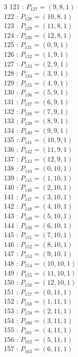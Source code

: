 \documentclass{article}
\begin{document}
{\begin{multicols}{3}
121 : $P_{127}=( 9, 8, 1 )$\\
122 : $P_{128}=( 10, 8, 1 )$\\
123 : $P_{129}=( 11, 8, 1 )$\\
124 : $P_{130}=( 12, 8, 1 )$\\
125 : $P_{131}=( 0, 9, 1 )$\\
126 : $P_{132}=( 1, 9, 1 )$\\
127 : $P_{133}=( 2, 9, 1 )$\\
128 : $P_{134}=( 3, 9, 1 )$\\
129 : $P_{135}=( 4, 9, 1 )$\\
130 : $P_{136}=( 5, 9, 1 )$\\
131 : $P_{137}=( 6, 9, 1 )$\\
132 : $P_{138}=( 7, 9, 1 )$\\
133 : $P_{139}=( 8, 9, 1 )$\\
134 : $P_{140}=( 9, 9, 1 )$\\
135 : $P_{141}=( 10, 9, 1 )$\\
136 : $P_{142}=( 11, 9, 1 )$\\
137 : $P_{143}=( 12, 9, 1 )$\\
138 : $P_{144}=( 0, 10, 1 )$\\
139 : $P_{145}=( 1, 10, 1 )$\\
140 : $P_{146}=( 2, 10, 1 )$\\
141 : $P_{147}=( 3, 10, 1 )$\\
142 : $P_{148}=( 4, 10, 1 )$\\
143 : $P_{149}=( 5, 10, 1 )$\\
144 : $P_{150}=( 6, 10, 1 )$\\
145 : $P_{151}=( 7, 10, 1 )$\\
146 : $P_{152}=( 8, 10, 1 )$\\
147 : $P_{153}=( 9, 10, 1 )$\\
148 : $P_{154}=( 10, 10, 1 )$\\
149 : $P_{155}=( 11, 10, 1 )$\\
150 : $P_{156}=( 12, 10, 1 )$\\
151 : $P_{157}=( 0, 11, 1 )$\\
152 : $P_{158}=( 1, 11, 1 )$\\
153 : $P_{159}=( 2, 11, 1 )$\\
154 : $P_{160}=( 3, 11, 1 )$\\
155 : $P_{161}=( 4, 11, 1 )$\\
156 : $P_{162}=( 5, 11, 1 )$\\
157 : $P_{163}=( 6, 11, 1 )$\\

\end{multicols}}
\end{document}
